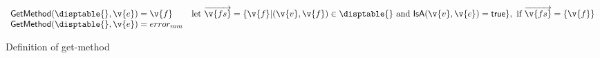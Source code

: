 \begin{figure*}
$$
\begin{array}{lclr}

  \getmethod {\disptable{}}
             {\v{e}}
             {\v{f}}

             & 
             \text{let } {\overrightarrow{\v{fs}}} = \{ \v{f} | (\v{v}, \v{f}) \in \disptable{} \text{ and } \isaopsem{\v{v}}{\v{e}} = \true{} \}, \text{ if } {\overrightarrow{\v{fs}}} = \{\v{f}\}

             \\
  \getmethod {\disptable{}}
             {\v{e}}
             {\mmerror{}}

\end{array}
$$
\caption{Definition of get-method}
\end{figure*}
